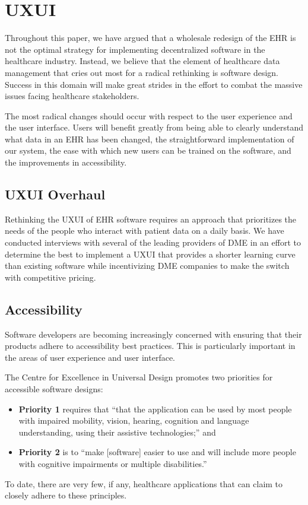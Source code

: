 \section{UXUI}
Throughout this paper, we have argued that a wholesale redesign of the EHR is not the optimal strategy for implementing decentralized software in the healthcare industry. Instead, we believe that the element of healthcare data management that cries out most for a radical rethinking is software design. Success in this domain will make great strides in the effort to combat the massive issues facing healthcare stakeholders.%

The most radical changes should occur with respect to the user experience and the user interface. Users will benefit greatly from being able to clearly understand what data in an EHR has been changed, the straightforward implementation of our system, the ease with which new users can be trained on the software, and the improvements in accessibility.%

\subsection{UXUI Overhaul}
Rethinking the UXUI of EHR software requires an approach that prioritizes the needs of the people who interact with patient data on a daily basis. We have conducted interviews with several of the leading providers of DME in an effort to determine the best to implement a UXUI that provides a shorter learning curve than existing software while incentivizing DME companies to make the switch with competitive pricing.%

\subsection{Accessibility}
Software developers are becoming increasingly concerned with ensuring that their products adhere to accessibility best practices.\cite{w3Accessibility} This is particularly important in the areas of user experience and user interface.%

The Centre for Excellence in Universal Design\cite{universaldesign} promotes two priorities for accessible software designs:%
  \begin{itemize}
    \item \textbf{Priority 1} requires that ``that the application can be used by most people with impaired mobility, vision, hearing, cognition and language understanding, using their assistive technologies;'' and
    \item \textbf{Priority 2} is to ``make [software] easier to use and will include more people with cognitive impairments or multiple disabilities.''
  \end{itemize}
To date, there are very few, if any, healthcare applications that can claim to closely adhere to these principles.%

